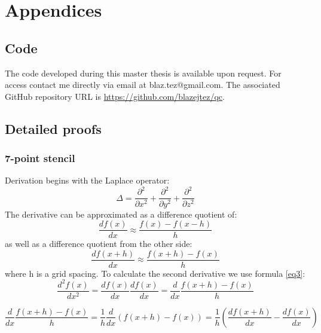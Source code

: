 \section{Appendices}
\subsection{Code}

The code developed during this master thesis is available upon request. For access contact me directly via email at blaz.tez@gmail.com. The associated GitHub repository URL is \url{https://github.com/blazejtez/qc}.

\subsection{Detailed proofs}
\subsubsection{7-point stencil}
Derivation begins with the Laplace operator:
\begin{equation}
	\Delta = \frac{\partial^2}{\partial x^2} + \frac{\partial^2}{\partial y^2} + \frac{\partial^2}{\partial z^2}
	\label{eq1}
\end{equation}
The derivative can be approximated as a difference quotient of:
\begin{equation}
	\frac{df(x)}{dx} \approx \frac{f(x)-f(x-h)}{h}
	\label{eq2}
\end{equation}
as well as a difference quotient from the other side:
\begin{equation}
	\frac{df(x+h)}{dx} \approx \frac{f(x+h)-f(x)}{h}
	\label{eq3}
\end{equation}
where h is a grid spacing.
To calculate the second derivative we use formula \ref{eq3}:
\begin{equation}
	\frac{d^2f(x)}{dx^2} = \frac{df(x)}{dx} \frac{df(x)}{dx} = \frac{d}{dx} \frac{f(x+h)-f(x)}{h}
\end{equation}

\begin{equation}
	\frac{d}{dx} \frac{f(x+h)-f(x)}{h} = \frac{1}{h} \frac{d}{dx}(f(x+h)-f(x)) = \frac{1}{h} (\frac{df(x+h)}{dx} - \frac{df(x)}{dx})
\end{equation}

